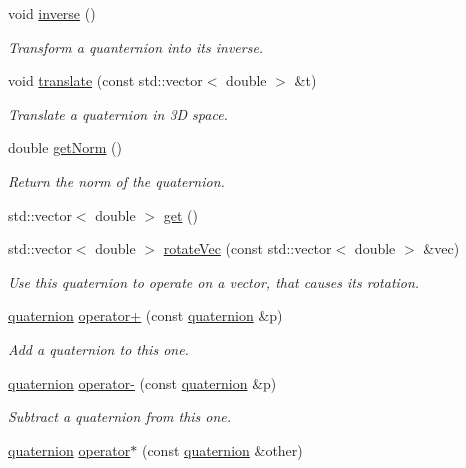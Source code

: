 \begin{DoxyCompactItemize}
void \hyperlink{classquaternion_a1fa2dac4be850e01aa08103dac746b64}{inverse} ()
\begin{DoxyCompactList}\small\item\em Transform a quanternion into its inverse. \end{DoxyCompactList}\item 
void \hyperlink{classquaternion_ab8f466daaaa9a122a86da6fe713f62fe}{translate} (const std\-::vector$<$ double $>$ \&t)
\begin{DoxyCompactList}\small\item\em Translate a quaternion in 3\-D space. \end{DoxyCompactList}\item 
double \hyperlink{classquaternion_a28ff31359622e09c9c292f78cf08b801}{get\-Norm} ()
\begin{DoxyCompactList}\small\item\em Return the norm of the quaternion. \end{DoxyCompactList}\item 
std\-::vector$<$ double $>$ \hyperlink{classquaternion_af701c4a67c60f98af80e3c3caeb5bd4a}{get} ()
\item 
std\-::vector$<$ double $>$ \hyperlink{classquaternion_a618cce42beeb9ab3c724c4a9e6f37f55}{rotate\-Vec} (const std\-::vector$<$ double $>$ \&vec)
\begin{DoxyCompactList}\small\item\em Use this quaternion to operate on a vector, that causes its rotation. \end{DoxyCompactList}\item 
\hyperlink{classquaternion}{quaternion} \hyperlink{classquaternion_a3cf72d92681c00362e59e7ff96d0ea4f}{operator+} (const \hyperlink{classquaternion}{quaternion} \&p)
\begin{DoxyCompactList}\small\item\em Add a quaternion to this one. \end{DoxyCompactList}\item 
\hyperlink{classquaternion}{quaternion} \hyperlink{classquaternion_af299a0ea61d45ff4cb9a8551e7cad01a}{operator-\/} (const \hyperlink{classquaternion}{quaternion} \&p)
\begin{DoxyCompactList}\small\item\em Subtract a quaternion from this one. \end{DoxyCompactList}\item 
\hyperlink{classquaternion}{quaternion} \hyperlink{classquaternion_ab8c2b2a742c75b683f75f763a8ecf0aa}{operator$\ast$} (const \hyperlink{classquaternion}{quaternion} \&other)

\end{DoxyCompactItemize}
